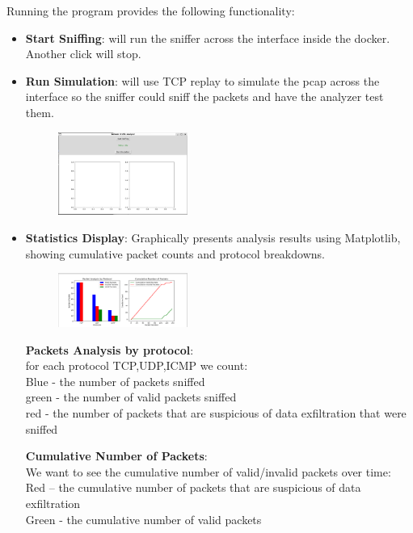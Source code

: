 \documentclass{article}
\begin{document}
\newpage
Running the program provides the following functionality:
\begin{itemize}
    \item \textbf{Start Sniffing}: will run the sniffer across the interface inside the docker. Another click will stop.
    \item \textbf{Run Simulation}: will use TCP replay to simulate the pcap across the interface so the sniffer could sniff the packets and have the analyzer test them.
    \begin{figure}[H]
        \centering
        \includegraphics[width=0.4\textwidth]{gui 1.png}
    \end{figure}
    \item \textbf{Statistics Display}: Graphically presents analysis results using Matplotlib, showing cumulative packet counts and protocol breakdowns.
    \begin{figure}[H]
        \centering
        \includegraphics[width=0.4\textwidth]{gui 2.png}
    \end{figure}
    \textbf{Packets Analysis by protocol}: \\
    for each protocol TCP,UDP,ICMP we count: \\
    Blue - the number of packets sniffed \\
    green - the number of valid packets sniffed \\
    red - the number of packets that are suspicious of data exfiltration that were sniffed

    \textbf{Cumulative Number of Packets}: \\
    We want to see the cumulative number of  valid/invalid packets over time: \\
    Red – the cumulative number of packets that are suspicious of data exfiltration \\
    Green - the cumulative number of valid packets
\end{itemize}
\end{document}

